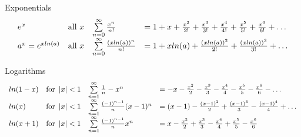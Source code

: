 \begin{framed}

   \iffalse
 Exponentials
 \renewcommand{\arraystretch}{1.5}
 \[
    \begin{array}{l  c  l l}
      e^x 
      & \text{all } x
      & \sum\limits_{n=0}^{\infty} \frac{x^n}{n!} 
      & = 1 + x + \frac{x^2}{2!} + \frac{x^3}{3!} + \frac{x^4}{4!} + \frac{x^5}{5!} + \frac{x^6}{6!} + \hdots\\
      a^x  = e^{x ln (a)}
      & \text{all } x
      & \sum\limits_{n=0}^{\infty} \frac{(x ln(a))^n}{n!} 
      & = 1 + x ln(a) + \frac{(xln(a))^2}{2!} + \frac{(x ln(a))^3}{3!} + \hdots\\
   \end{array}
 \] 

 Logarithms
 \[
    \begin{array}{l c l l}
      ln(1-x)
      & \text{for } \left| x \right| < 1
      & \sum\limits_{n=1}^{\infty} \frac{1}{n} -x^n
      & = -x - \frac{x^2}{2} -\frac{x^3}{3} - \frac{x^4}{4} - \frac{x^5}{5} - \frac{x^6}{6} - \hdots\\ 
      ln(x)
      & \text{for } \left| x \right| < 1
      & \sum\limits_{n=1}^{\infty} \frac{(-1)^{n-1}}{n}(x-1)^n
      & = (x-1) - \frac{(x-1)^2}{2} + \frac{(x-1)^3}{3} - \frac{(x-1)^4}{4} + \hdots\\
      ln(x + 1)
      & \text{for } \left| x \right| < 1
      & \sum\limits_{n=1}^{\infty} \frac{(-1)^{n-1}}{n}  x^n
      & = x - \frac{x^2}{2} + \frac{x^3}{3} - \frac{x^4}{4} + \frac{x^5}{5} - \frac{x^6}{6}\\
   \end{array}
 \] 


\end{framed}
